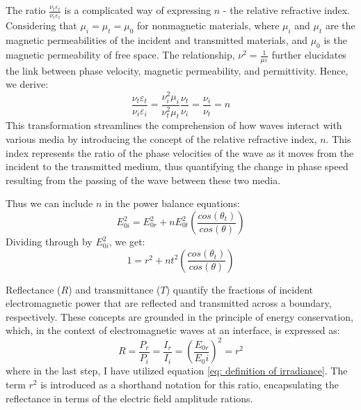 The ratio $\frac{\nu_t\varepsilon_t}{\nu_i\varepsilon_i}$ is a complicated way of expressing $n$ - the relative refractive index. Considering that $\mu_i = \mu_t = \mu_0$ for nonmagnetic materials, where $\mu_i$ and $\mu_t$ are the magnetic permeabilities of the incident and transmitted materials, and $\mu_0$ is the magnetic permeability of free space. The relationship, $\nu^2 = \frac{1}{\mu \varepsilon}$ further elucidates the link between phase velocity, magnetic permeability, and permittivity. Hence, we derive:
\begin{equation}
\frac{\nu_t\varepsilon_t}{\nu_i\varepsilon_i} = \frac{\nu_i^2\mu_i}{\nu_t^2\mu_t} \frac{\nu_t}{\nu_i} = \frac{\nu_i}{\nu_t} = n
\end{equation}
This transformation streamlines the comprehension of how waves interact with various media by introducing the concept of the relative refractive index, $n$. This index represents the ratio of the phase velocities of the wave as it moves from the incident to the transmitted medium, thus quantifying the change in phase speed resulting from the passing of the wave between these two media.

Thus we can include $n$ in the power balance equations:
\begin{equation}
E_{0i}^2 = E_{0r}^2 + n E_{0t}^2 \left(\frac{cos(\theta_t)}{cos(\theta)} \right)
\end{equation}
Dividing through by $E_{0i}^2$, we get:
\begin{equation} \label{power balance equation with r^2 and t^2}
1 = r^2 + n t^2 \left(\frac{cos(\theta_t)}{cos(\theta)} \right)
\end{equation}

Reflectance ($R$) and transmittance ($T$) quantify the fractions of incident electromagnetic power that are reflected and transmitted across a boundary, respectively. These concepts are grounded in the principle of energy conservation, which, in the context of electromagnetic waves at an interface, is expressed as:
\begin{equation}
    R = \frac{P_r}{P_i} = \frac{I_r}{I_i} = \left(\frac{E_{0r}}{E_0i}\right)^2 = r^2
\end{equation}
where in the last step, I have utilized equation \ref{eq: definition of irradiance}. The term $r^2$ is introduced as a shorthand notation for this ratio, encapsulating the reflectance in terms of the electric field amplitude rations.

